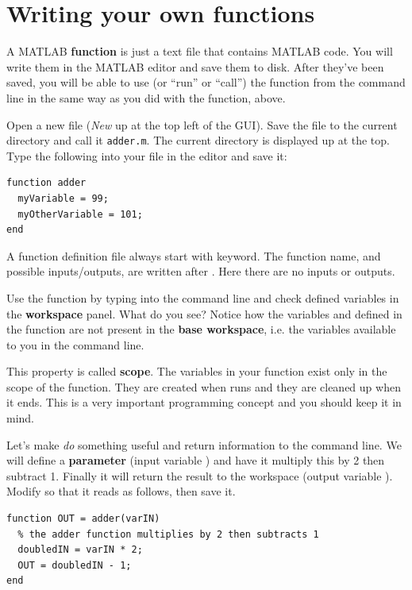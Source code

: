 \documentclass{article}
\begin{document}
\section{Writing your own functions}

A MATLAB \textbf{function} is just a text file that contains MATLAB code.
You will write them in the MATLAB editor and save them to disk.
After they've been saved, you will be able to use (or ``run'' or ``call'') the function 
from the command line in the same way as you did with the  function, above.

Open a new file (\emph{New} up at the top left of the GUI). 
Save the file to the current directory and call it \verb|adder.m|.
The current directory is displayed up at the top. 
Type the following into your file in the editor and save it:
\begin{lstlisting}
function adder
  myVariable = 99;
  myOtherVariable = 101;
end
\end{lstlisting}
A function definition file always start with  keyword.
The function name, and possible inputs/outputs, are written after .
Here there are no inputs or outputs.

Use the function by typing  into the command line and check defined variables in the \textbf{workspace} panel. What do you see?
Notice how the variables  and  defined in the  function are not present in the \textbf{base workspace}, i.e. the variables available to you in the command line.

This property is called \textbf{scope}.
The variables in your  function exist only in the scope of the  function.
They are created when  runs and they are cleaned up when it ends.
This is a very important programming concept and you should keep it in mind.

Let's make  \emph{do} something useful and return information to the command line.
We will define a \textbf{parameter} (input variable ) and have it multiply this by 2 then subtract 1.
Finally it will return the result to the workspace (output variable ).
Modify  so that it reads as follows, then save it.
\begin{lstlisting}
function OUT = adder(varIN)
  % the adder function multiplies by 2 then subtracts 1
  doubledIN = varIN * 2;
  OUT = doubledIN - 1;
end
\end{lstlisting}
\end{document}

